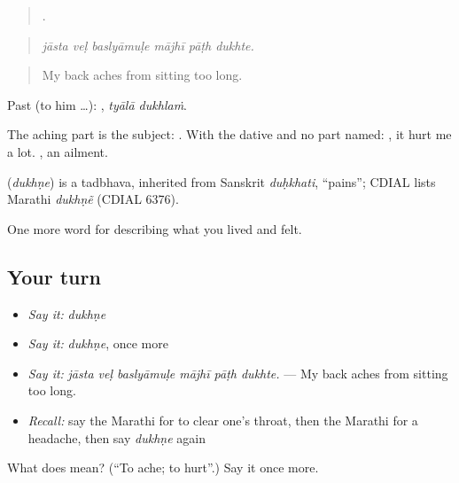 \begin{quote}
     .
\end{quote}

\begin{quote}
\emph{jāsta veḷ baslyāmuḷe mājhī pāṭh dukhte.}
\end{quote}

\begin{quote}
My back aches from sitting too long.
\end{quote}

Past (to him …):  , \emph{tyālā dukhlaṁ}.

The aching part is the subject:   . With the dative and no part named:   , it hurt me a lot. , an ailment.

\begin{cousinweb}
\textbf{} (\emph{dukhṇe}) is a tadbhava, inherited from Sanskrit \emph{duḥkhati}, \textquotedblleft{}pains\textquotedblright{}; CDIAL lists Marathi \emph{dukhṇẽ} (CDIAL 6376).
\end{cousinweb}

\begin{grammarlens}[title={What you've built}]
One more word for describing what you lived and felt.
\end{grammarlens}

\subsection*{Your turn}
\begin{itemize}
\raggedright
  \item \emph{Say it:} \emph{dukhṇe}
  \item \emph{Say it:} \emph{dukhṇe}, once more
  \item \emph{Say it:} \emph{jāsta veḷ baslyāmuḷe mājhī pāṭh dukhte.} — My back aches from sitting too long.
  \item \emph{Recall:} say the Marathi for to clear one's throat, then the Marathi for a headache, then say \emph{dukhṇe} again
\end{itemize}

\begin{tcolorbox}[breakable,colback=teal!4,colframe=teal!35!black,title={Before you move on}]
What does  mean? (\textquotedblleft{}To ache; to hurt\textquotedblright{}.) Say it once more.
\end{tcolorbox}
